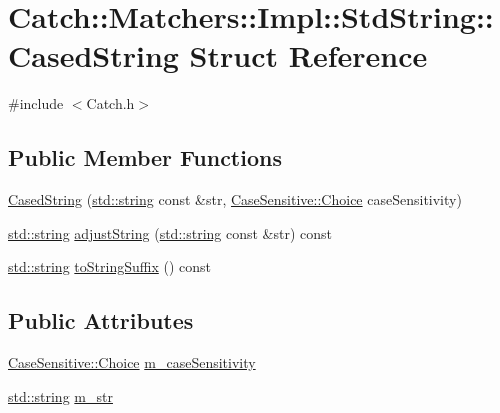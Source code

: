 \hypertarget{struct_catch_1_1_matchers_1_1_impl_1_1_std_string_1_1_cased_string}{}\section{Catch\+:\+:Matchers\+:\+:Impl\+:\+:Std\+String\+:\+:Cased\+String Struct Reference}
\label{struct_catch_1_1_matchers_1_1_impl_1_1_std_string_1_1_cased_string}


{\ttfamily \#include $<$Catch.\+h$>$}

\subsection*{Public Member Functions}
\begin{DoxyCompactItemize}
\item 
\hyperlink{struct_catch_1_1_matchers_1_1_impl_1_1_std_string_1_1_cased_string_aebd017c88423d8a11c62cff85754a22d}{Cased\+String} (\hyperlink{_s_d_l__opengl__glext_8h_ae84541b4f3d8e1ea24ec0f466a8c568b}{std\+::string} const \&str, \hyperlink{struct_catch_1_1_case_sensitive_aad49d3aee2d97066642fffa919685c6a}{Case\+Sensitive\+::\+Choice} case\+Sensitivity)
\item 
\hyperlink{_s_d_l__opengl__glext_8h_ae84541b4f3d8e1ea24ec0f466a8c568b}{std\+::string} \hyperlink{struct_catch_1_1_matchers_1_1_impl_1_1_std_string_1_1_cased_string_aaf5c4be8b3b8b317777d0e332d3733b5}{adjust\+String} (\hyperlink{_s_d_l__opengl__glext_8h_ae84541b4f3d8e1ea24ec0f466a8c568b}{std\+::string} const \&str) const 
\item 
\hyperlink{_s_d_l__opengl__glext_8h_ae84541b4f3d8e1ea24ec0f466a8c568b}{std\+::string} \hyperlink{struct_catch_1_1_matchers_1_1_impl_1_1_std_string_1_1_cased_string_ae5865fa1dd20c80498a094cae5459883}{to\+String\+Suffix} () const 
\end{DoxyCompactItemize}
\subsection*{Public Attributes}
\begin{DoxyCompactItemize}
\item 
\hyperlink{struct_catch_1_1_case_sensitive_aad49d3aee2d97066642fffa919685c6a}{Case\+Sensitive\+::\+Choice} \hyperlink{struct_catch_1_1_matchers_1_1_impl_1_1_std_string_1_1_cased_string_af399ed93051d8981e298206dee6898b3}{m\+\_\+case\+Sensitivity}
\item 
\hyperlink{_s_d_l__opengl__glext_8h_ae84541b4f3d8e1ea24ec0f466a8c568b}{std\+::string} \hyperlink{struct_catch_1_1_matchers_1_1_impl_1_1_std_string_1_1_cased_string_a9f8ce063a934330ac59bf8638f047e99}{m\+\_\+str}
\end{DoxyCompactItemize}


